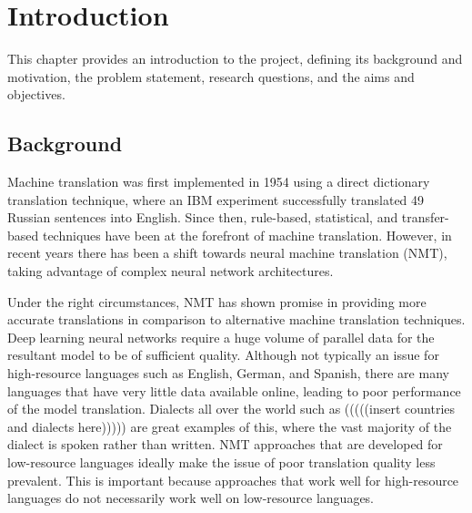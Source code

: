 \chapter{Introduction}
\label{introduction}
This chapter provides an introduction to the project, defining its background and motivation, the problem statement, research questions, and the aims and objectives.

\section{Background}
\label{Background and Motivation}
Machine translation was first implemented in 1954 using a direct dictionary translation technique, where an IBM experiment successfully translated 49 Russian sentences into English.
Since then, rule-based, statistical, and transfer-based techniques have been at the forefront of machine translation. However, in recent years there has been a shift towards neural machine translation (NMT), taking advantage of complex neural network architectures.

Under the right circumstances, NMT has shown promise in providing more accurate translations in comparison to alternative machine translation techniques. Deep learning neural networks require a huge volume of parallel data for the resultant model to be of sufficient quality. Although not typically an issue for high-resource languages such as English, German, and Spanish, there are many languages that have very little data available online, leading to poor performance of the model translation. Dialects all over the world such as (((((insert        countries       and      dialects     here))))) are great examples of this, where the vast majority of the dialect is spoken rather than written. NMT approaches that are developed for low-resource languages ideally make the issue of poor translation quality less prevalent. This is important because approaches that work well for high-resource languages do not necessarily work well on low-resource languages.


